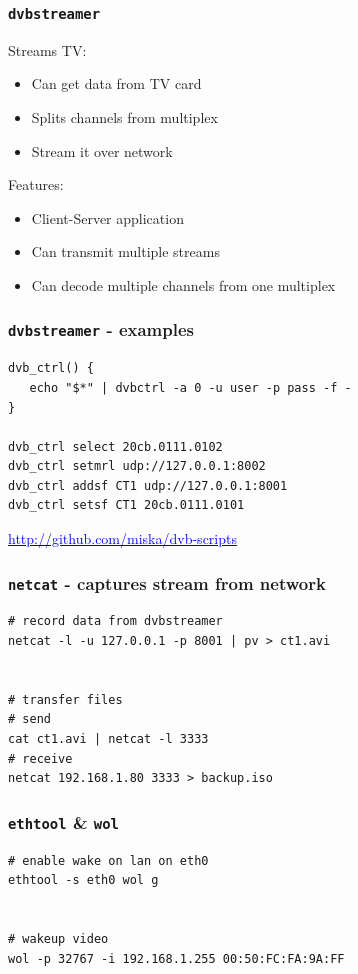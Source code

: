 \documentclass{beamer}
\begin{document}
\begin{frame}[t]
	\frametitle{\texttt{dvbstreamer}}
	Streams TV:
	\begin{itemize}
		\item Can get data from TV card
		\item Splits channels from multiplex
		\item Stream it over network
	\end{itemize}
	\vspace{0.5cm}
	Features:
	\begin{itemize}
		\item Client-Server application
		\item Can transmit multiple streams
		\item Can decode multiple channels from one multiplex
	\end{itemize}
\end{frame}

\begin{frame}[t,fragile]
	\frametitle{\texttt{dvbstreamer} - examples}
	\begin{verbatim}
dvb_ctrl() {
   echo "$*" | dvbctrl -a 0 -u user -p pass -f -
}

dvb_ctrl select 20cb.0111.0102
dvb_ctrl setmrl udp://127.0.0.1:8002
dvb_ctrl addsf CT1 udp://127.0.0.1:8001
dvb_ctrl setsf CT1 20cb.0111.0101
	\end{verbatim}
	\vfill

	\hfill\href{http://github.com/miska/dvb-scripts}{\textcolor{blue}{http://github.com/miska/dvb-scripts}}
\end{frame}

\begin{frame}[fragile]
	\frametitle{\texttt{netcat} - captures stream from network}
	\begin{verbatim}
# record data from dvbstreamer
netcat -l -u 127.0.0.1 -p 8001 | pv > ct1.avi


# transfer files
# send
cat ct1.avi | netcat -l 3333
# receive
netcat 192.168.1.80 3333 > backup.iso
	\end{verbatim}
\end{frame}

\begin{frame}[fragile]
	\frametitle{\texttt{ethtool} \& \texttt{wol}}
	\begin{verbatim}
# enable wake on lan on eth0
ethtool -s eth0 wol g


# wakeup video
wol -p 32767 -i 192.168.1.255 00:50:FC:FA:9A:FF
	\end{verbatim}
\end{frame}

\end{document}
